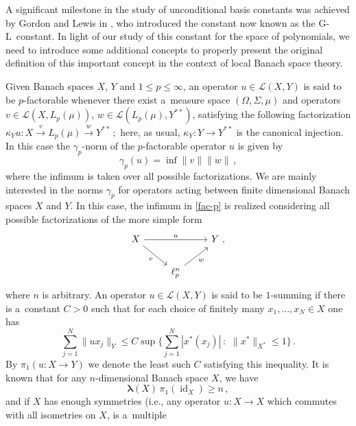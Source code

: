 \documentclass[12pt]{amsart}
\numberwithin{subsection}{section}
\theoremstyle{definition}
\theoremstyle{remark}
\DeclareMathOperator{\id}{\mathrm{id}}
\begin{document}
A significant milestone in the study of  unconditional basis constants was achieved by Gordon and Lewis in \cite{gordon1974absolutely},
who introduced the constant now known as the G-L~constant. In light of our study of this constant for the space of polynomials,
we need to introduce some additional concepts to properly present the original definition of this important  concept in the context of
local Banach space theory.

Given Banach spaces $X$, $Y$ and $1 \leq p \leq \infty$, an  operator $u\in \mathcal{L}(X,Y)$ is said to be $p$-factorable
whenever  there exist a~measure space $(\Omega, \Sigma, \mu)$ and operators $v \in  \mathcal{L}(X, L_p(\mu))$,
$w \in \mathcal{L}(L_p(\mu), Y^{\ast\ast})$, satisfying the following factorization
$
\kappa_Yu\colon X \stackrel{v} \longrightarrow L_p(\mu) \stackrel{w} \longrightarrow Y^{\ast\ast}\,;
$
here, as usual, $\kappa_{Y}\colon Y \to Y^{\ast\ast}$ is the canonical injection. In this case the $\gamma_p$-norm of the
$p$-factorable operator $u$ is given by
\begin{equation}\label{fac-p}
 \gamma_p(u) = \inf \|v\| \|w\|\,,
\end{equation}
where the infimum is taken over all possible factorizations. We are  mainly interested  in the  norms  $\gamma_p$ for operators acting
between  finite dimensional Banach spaces $X$ and $Y$. In this case, the infimum in \eqref{fac-p} is realized considering all possible
factorizations of the more simple form
\begin{equation*}
\begin{tikzcd}
X  \arrow[rd, "v"']  \arrow[rr, "u"] &  & Y \,\,,\\
& \ell_p^n   \arrow[ru, "w"'] &
\end{tikzcd}
\end{equation*}
where $n$ is arbitrary.
An operator $u\in \mathcal{L}(X,Y)$ is said to be $1$-summing  if there is a~constant $C>0$ such that
for each choice of finitely many $x_1, \ldots, x_N\in X$ one has
\[
\sum_{j=1}^N \|ux_j\|_Y  \leq C
\sup\Big\{\sum_{j=1}^{N} |x^\ast(x_j)|\,:\,\, \|x^\ast\|_{X^\ast} \leq 1\Big\}\,.
\]
By $\pi_{1}(u\colon X\to Y)$  we denote the least such $C$ satisfying this inequality. It is known that  for any $n$-dimensional
Banach space $X$, we have
\begin{equation*}
\boldsymbol{\lambda}(X)\,\pi_1(\id_X) \geq n\,,
\end{equation*}
and if $X$ has enough symmetries (i.e., any operator $u\colon X \to X$ which commutes with all isometries on $X$, is a~multiple
\end{document}
